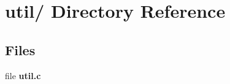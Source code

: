 \hypertarget{dir_000035}{
\section{util/ Directory Reference}
\label{dir_000035}
}
\subsection*{Files}
\begin{CompactItemize}
\item 
file {\bf util.c}
\end{CompactItemize}
